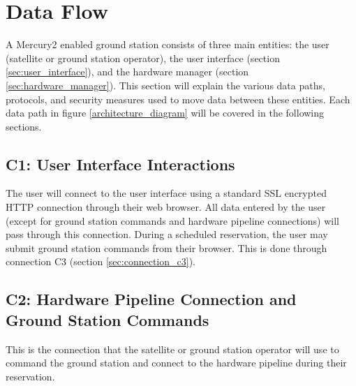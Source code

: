 \documentclass{mxl-design}
\begin{document}
\section{Data Flow}
\label{sec:data_flow}
A Mercury2 enabled ground station consists of three main entities: the user (satellite or ground station operator), the user interface (section \ref{sec:user_interface}), and the hardware manager (section \ref{sec:hardware_manager}). This section will explain the various data paths, protocols, and security measures used to move data between these entities. Each data path in figure \ref{architecture_diagram} will be covered in the following sections.

\subsection{C1: User Interface Interactions}
\label{sec:connection_c1}
The user will connect to the user interface using a standard SSL encrypted HTTP connection through their web browser. All data entered by the user (except for ground station commands and hardware pipeline connections) will pass through this connection. During a scheduled reservation, the user may submit ground station commands from their browser. This is done through connection C3 (section \ref{sec:connection_c3}).

\subsection{C2: Hardware Pipeline Connection and Ground Station Commands}
\label{sec:connection_c2}
This is the connection that the satellite or ground station operator will use to command the ground station and connect to the hardware pipeline during their reservation.
\end{document}
